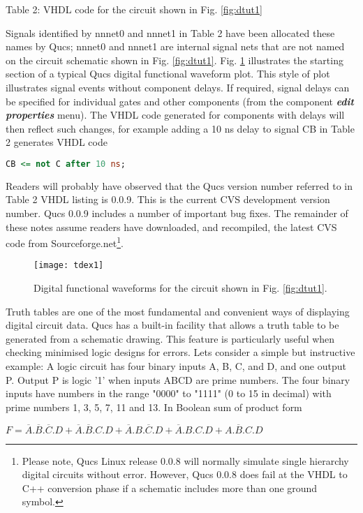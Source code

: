 \begin{flushleft}
Table 2: VHDL code for the circuit shown in Fig. \ref{fig:dtut1}
\end{flushleft}
Signals identified by nnnet0 and nnnet1 in Table 2 have been allocated
these names by Qucs; nnnet0 and nnnet1 are internal signal nets that
are not named on the circuit schematic shown in Fig. \ref{fig:dtut1}.
Fig. \ref{fig:tdex1} illustrates the starting section of a typical
Qucs digital functional waveform plot.  This style of plot illustrates
signal events without component delays.  If required, signal delays
can be specified for individual gates and other components (from the
component \textbf{\textit{edit properties}} menu).  The VHDL code
generated for components with delays will then reflect such changes,
for example adding a 10 ns delay to signal CB in Table 2 generates
VHDL code
\begin{lstlisting}[language=VHDL]
CB <= not C after 10 ns;
\end{lstlisting}

Readers will probably have observed that the Qucs version number
referred to in Table 2 VHDL listing is 0.0.9.  This is the current CVS
development version number.  Qucs 0.0.9 includes a number of important
bug fixes.  The remainder of these notes assume readers have
downloaded, and recompiled, the latest CVS code from
Sourceforge.net\footnote{Please note, Qucs Linux release 0.0.8 will
normally simulate single hierarchy digital circuits without error.
However, Qucs 0.0.8 does fail at the VHDL to C++ conversion phase if a
schematic includes more than one ground symbol.}.

\begin{figure}[ht]
  \centering
  \texttt{[image: tdex1]}
  \caption{Digital functional waveforms for the circuit shown in Fig. \ref{fig:dtut1}.}
  \label{fig:tdex1}
\end{figure}


Truth tables are one of the most fundamental and convenient ways of
displaying digital circuit data.  Qucs has a built-in facility that
allows a truth table to be generated from a schematic drawing.  This
feature is particularly useful when checking minimised logic designs
for errors.  Lets consider a simple but instructive example: A logic
circuit has four binary inputs A, B, C, and D, and one output P.
Output P is logic '1' when inputs ABCD are prime numbers.  The four
binary inputs have numbers in the range "0000" to "1111" (0 to 15 in
decimal) with prime numbers 1, 3, 5, 7, 11 and 13.  In Boolean sum of
product form \\
\begin{center}
\begin{large}$F=\overline{A}.\overline{B}.\overline{C}.D+\overline{A}.\overline{B}.C.D+
\overline{A}.B.\overline{C}.D+\overline{A}.B.C.D+A.\overline{B}.C.D$
\end{large}\end{center}

